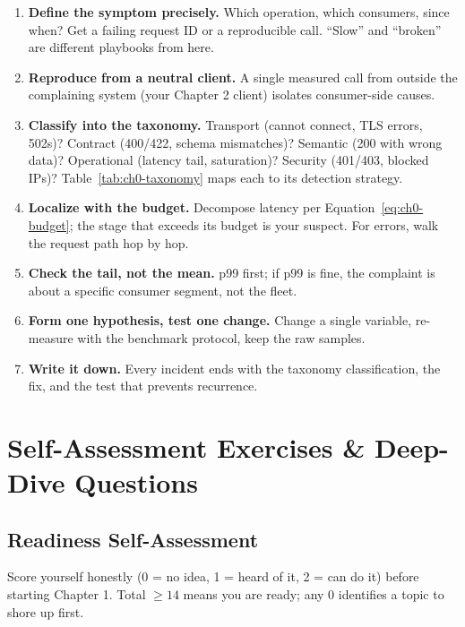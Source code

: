 \begin{enumerate}
  \item \textbf{Define the symptom precisely.} Which operation, which
    consumers, since when? Get a failing request ID or a reproducible call.
    ``Slow'' and ``broken'' are different playbooks from here.
  \item \textbf{Reproduce from a neutral client.} A single measured call from
    outside the complaining system (your Chapter 2 client) isolates
    consumer-side causes.
  \item \textbf{Classify into the taxonomy.} Transport (cannot connect,
    TLS errors, 502s)? Contract (400/422, schema mismatches)? Semantic
    (200 with wrong data)? Operational (latency tail, saturation)? Security
    (401/403, blocked IPs)? Table~\ref{tab:ch0-taxonomy} maps each to its
    detection strategy.
  \item \textbf{Localize with the budget.} Decompose latency per
    Equation~\eqref{eq:ch0-budget}; the stage that exceeds its budget is
    your suspect. For errors, walk the request path hop by hop.
  \item \textbf{Check the tail, not the mean.} p99 first; if p99 is fine,
    the complaint is about a specific consumer segment, not the fleet.
  \item \textbf{Form one hypothesis, test one change.} Change a single
    variable, re-measure with the benchmark protocol, keep the raw samples.
  \item \textbf{Write it down.} Every incident ends with the taxonomy
    classification, the fix, and the test that prevents recurrence.
\end{enumerate}
\section{Self-Assessment Exercises \& Deep-Dive Questions}
\label{sec:ch0-selfassess}

\subsection{Readiness Self-Assessment}

Score yourself honestly (0 = no idea, 1 = heard of it, 2 = can do it) before
starting Chapter 1. Total $\geq 14$ means you are ready; any 0 identifies a
topic to shore up first.

